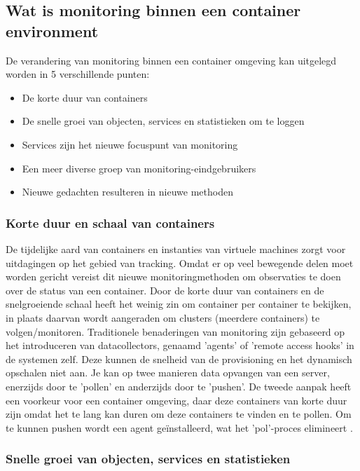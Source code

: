 \subsection{Wat is monitoring binnen een container environment}

De verandering van monitoring binnen een container omgeving kan uitgelegd worden in 5 verschillende punten:

\begin{itemize}
    \item De korte duur van containers
    \item De snelle groei van objecten, services en statistieken om te loggen
    \item Services zijn het nieuwe focuspunt van monitoring
    \item Een meer diverse groep van monitoring-eindgebruikers
    \item Nieuwe gedachten resulteren in nieuwe methoden
\end{itemize}

\subsubsection{Korte duur en schaal van containers}

De tijdelijke aard van containers en instanties van virtuele machines zorgt voor uitdagingen op het gebied van tracking. Omdat er op veel bewegende delen moet worden gericht vereist dit nieuwe monitoringmethoden om observaties te doen over de status van een container. Door de korte duur van containers en de snelgroeiende schaal heeft het weinig zin om container per container te bekijken, in plaats daarvan wordt aangeraden om clusters (meerdere containers) te volgen/monitoren. Traditionele benaderingen van monitoring zijn gebaseerd op het introduceren van datacollectors, genaamd 'agents' of 'remote access hooks' in de systemen zelf. Deze kunnen de snelheid van de provisioning en het dynamisch opschalen niet aan. Je kan op twee manieren data opvangen van een server, enerzijds door te 'pollen' en anderzijds door te 'pushen'. De tweede aanpak heeft een voorkeur voor een container omgeving, daar deze containers van korte duur zijn omdat het te lang kan duren om deze containers te vinden en te pollen. Om te kunnen pushen wordt een agent geïnstalleerd, wat het 'pol'-proces elimineert \autocite{Williams2016}. 

\subsubsection{Snelle groei van objecten, services en statistieken}


